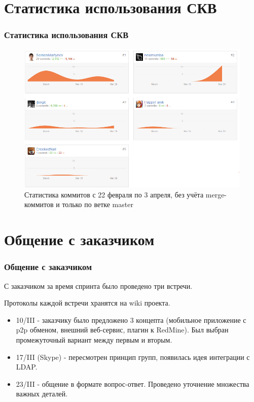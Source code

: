 \documentclass{beamer}
\newlength{\wideitemsep}
\let\olditem\item
\renewcommand{\item}{\setlength{\itemsep}{\wideitemsep}\olditem}
\begin{document}
\section{Статистика использования СКВ}

\begin{frame}
\frametitle{Статистика использования СКВ}

\begin{figure}
\includegraphics[scale=0.47]{res/r2_statistic}
\caption{Статистика коммитов с 22 февраля по 3 апреля, без учёта merge-коммитов и только по ветке master}
\end{figure}


\end{frame}

\section{Общение с заказчиком}

\begin{frame}
\frametitle{Общение с заказчиком}

С заказчиком за время спринта было проведено три встречи.

Протоколы каждой встречи хранятся на wiki проекта.

\begin{itemize}
\item 10/III - заказчику было предложено 3 концепта (мобильное приложение с p2p обменом, внешний веб-сервис, плагин к RedMine). Был выбран промежуточный вариант между первым и вторым.
\item 17/III (Skype) - пересмотрен принцип групп, появилась идея интеграции с LDAP.
\item 23/III - общение в формате вопрос-ответ. Проведено уточнение множества важных деталей.
\end{itemize}

\end{frame}
\end{document}
